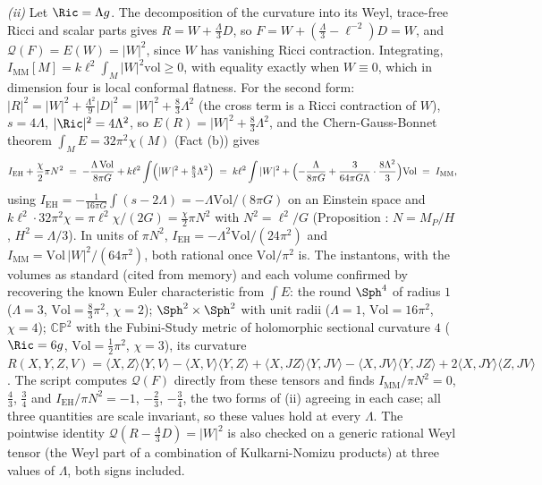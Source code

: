 \emph{(ii)} Let $\Ric = \Lambda g$. The decomposition of the curvature into its Weyl, trace-free Ricci and scalar parts gives $R = W + \tfrac{\Lambda}{3}D$, so $F = W + (\tfrac{\Lambda}{3} - \ell^{-2})D = W$, and $\mathcal{Q}(F) = E(W) = |W|^{2}$, since $W$ has vanishing Ricci contraction. Integrating, $I_{\mathrm{MM}}[M] = k\ell^{2}\int_{M}|W|^{2}\mathrm{vol} \ge 0$, with equality exactly when $W \equiv 0$, which in dimension four is local conformal flatness. For the second form: $|R|^{2} = |W|^{2} + \tfrac{\Lambda^{2}}{9}|D|^{2} = |W|^{2} + \tfrac83\Lambda^{2}$ (the cross term is a Ricci contraction of $W$), $s = 4\Lambda$, $|\Ric|^{2} = 4\Lambda^{2}$, so $E(R) = |W|^{2} + \tfrac83\Lambda^{2}$, and the Chern-Gauss-Bonnet theorem $\int_{M}E = 32\pi^{2}\chi(M)$ (Fact (b)) gives
\[
I_{\mathrm{EH}} + \frac{\chi}{2}\pi N^{2} \;=\; -\frac{\Lambda\,\mathrm{Vol}}{8\pi G} + k\ell^{2}\int\Bigl(|W|^{2} + \tfrac83\Lambda^{2}\Bigr) \;=\; k\ell^{2}\int|W|^{2} + \Bigl(-\frac{\Lambda}{8\pi G} + \frac{3}{64\pi G\Lambda}\cdot\frac{8\Lambda^{2}}{3}\Bigr)\mathrm{Vol} \;=\; I_{\mathrm{MM}},
\]
using $I_{\mathrm{EH}} = -\tfrac{1}{16\pi G}\int(s - 2\Lambda) = -\Lambda\mathrm{Vol}/(8\pi G)$ on an Einstein space and $k\ell^{2}\cdot 32\pi^{2}\chi = \pi\ell^{2}\chi/(2G) = \tfrac{\chi}{2}\pi N^{2}$ with $N^{2} = \ell^{2}/G$ (Proposition : $N = M_{P}/H$, $H^{2} = \Lambda/3$). In units of $\pi N^{2}$, $I_{\mathrm{EH}} = -\Lambda^{2}\mathrm{Vol}/(24\pi^{2})$ and $I_{\mathrm{MM}} = \mathrm{Vol}\,|W|^{2}/(64\pi^{2})$, both rational once $\mathrm{Vol}/\pi^{2}$ is. The instantons, with the volumes as standard (cited from memory) and each volume confirmed by recovering the known Euler characteristic from $\int E$: the round $\Sph^{4}$ of radius $1$ ($\Lambda = 3$, $\mathrm{Vol} = \tfrac83\pi^{2}$, $\chi = 2$); $\Sph^{2}\times\Sph^{2}$ with unit radii ($\Lambda = 1$, $\mathrm{Vol} = 16\pi^{2}$, $\chi = 4$); $\mathbb{CP}^{2}$ with the Fubini-Study metric of holomorphic sectional curvature $4$ ($\Ric = 6g$, $\mathrm{Vol} = \tfrac12\pi^{2}$, $\chi = 3$), its curvature $R(X,Y,Z,V) = \langle X,Z\rangle\langle Y,V\rangle - \langle X,V\rangle\langle Y,Z\rangle + \langle X,JZ\rangle\langle Y,JV\rangle - \langle X,JV\rangle\langle Y,JZ\rangle + 2\langle X,JY\rangle\langle Z,JV\rangle$. The script computes $\mathcal{Q}(F)$ directly from these tensors and finds $I_{\mathrm{MM}}/\pi N^{2} = 0$, $\tfrac43$, $\tfrac34$ and $I_{\mathrm{EH}}/\pi N^{2} = -1$, $-\tfrac23$, $-\tfrac34$, the two forms of (ii) agreeing in each case; all three quantities are scale invariant, so these values hold at every $\Lambda$. The pointwise identity $\mathcal{Q}(R - \tfrac{\Lambda}{3}D) = |W|^{2}$ is also checked on a generic rational Weyl tensor (the Weyl part of a combination of Kulkarni-Nomizu products) at three values of $\Lambda$, both signs included.

